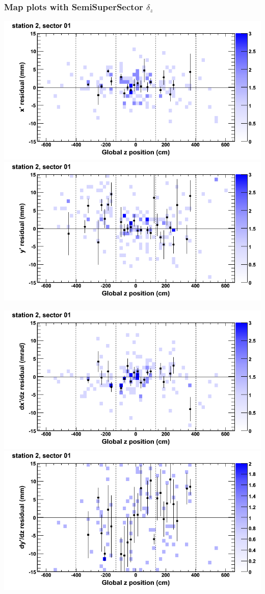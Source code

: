 \documentclass[compress]{beamer}
\begin{document}
\begin{frame}
\frametitle{Map plots with SemiSuperSector $\delta_z$}
\includegraphics[width=0.5\linewidth]{zfit_mapplots/DTvsz_st2sec01_x.png}
\includegraphics[width=0.5\linewidth]{zfit_mapplots/DTvsz_st2sec01_y.png}

\includegraphics[width=0.5\linewidth]{zfit_mapplots/DTvsz_st2sec01_dxdz.png}
\includegraphics[width=0.5\linewidth]{zfit_mapplots/DTvsz_st2sec01_dydz.png}
\end{frame}
\end{document}
